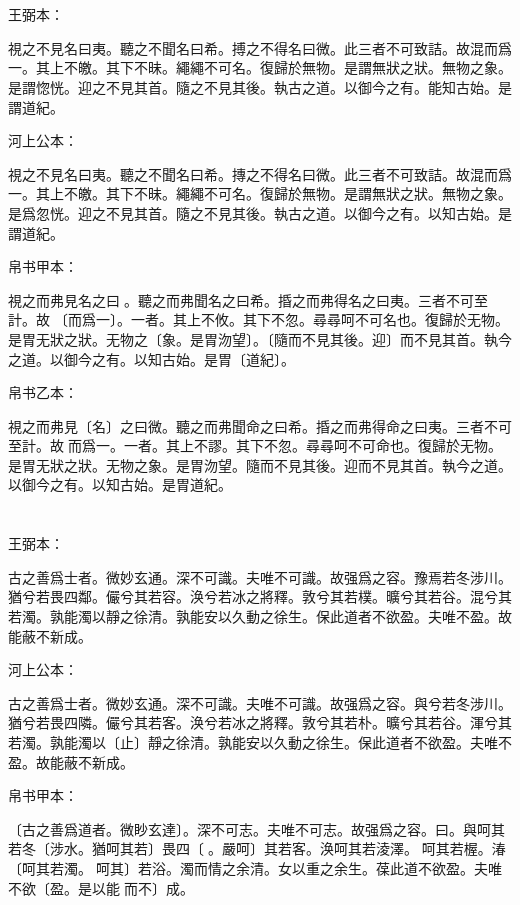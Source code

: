 \documentclass[a5paper]{ctexbook}
\begin{document}
    \chapter{}
    王弼本：

    視之不見名曰夷。聽之不聞名曰希。搏之不得名曰微。此三者不可致詰。故混而爲一。其上不皦。其下不昧。繩繩不可名。復歸於無物。是謂無狀之狀。無物之象。是謂惚恍。迎之不見其首。隨之不見其後。執古之道。以御今之有。能知古始。是謂道紀。

    河上公本：

    視之不見名曰夷。聽之不聞名曰希。摶之不得名曰微。此三者不可致詰。故混而爲一。其上不皦。其下不昧。繩繩不可名。復歸於無物。是謂無狀之狀。無物之象。是爲忽恍。迎之不見其首。隨之不見其後。執古之道。以御今之有。以知古始。是謂道紀。

    帛书甲本：

    視之而弗見名之曰󱁚。聽之而弗聞名之曰希。捪之而弗得名之曰夷。三者不可至計。故𡇯〔而爲一〕。一者。其上不攸。其下不忽。尋尋呵不可名也。復歸於无物。是胃无狀之狀。无物之〔象。是胃沕望〕。〔隨而不見其後。迎〕而不見其首。執今之道。以御今之有。以知古始。是胃〔道紀〕。

    帛书乙本：

    視之而弗見〔名〕之曰微。聽之而弗聞命之曰希。捪之而弗得命之曰夷。三者不可至計。故𦀲而爲一。一者。其上不謬。其下不忽。尋尋呵不可命也。復歸於无物。是胃无狀之狀。无物之象。是胃沕望。隨而不見其後。迎而不見其首。執今之道。以御今之有。以知古始。是胃道紀。

    \chapter{}
    王弼本：

    古之善爲士者。微妙玄通。深不可識。夫唯不可識。故强爲之容。豫焉若冬涉川。猶兮若畏四鄰。儼兮其若容。涣兮若冰之將釋。敦兮其若樸。曠兮其若谷。混兮其若濁。孰能濁以靜之徐清。孰能安以久動之徐生。保此道者不欲盈。夫唯不盈。故能蔽不新成。

    河上公本：

    古之善爲士者。微妙玄通。深不可識。夫唯不可識。故强爲之容。與兮若冬涉川。猶兮若畏四隣。儼兮其若客。涣兮若冰之將釋。敦兮其若朴。曠兮其若谷。渾兮其若濁。孰能濁以〔止〕靜之徐清。孰能安以久動之徐生。保此道者不欲盈。夫唯不盈。故能蔽不新成。

    帛书甲本：

    〔古之善爲道者。微眇玄達〕。深不可志。夫唯不可志。故强爲之容。曰。與呵其若冬〔涉水。猶呵其若〕畏四〔𠳵。嚴呵〕其若客。涣呵其若淩澤。󱁜呵其若楃。湷〔呵其若濁。𣼥呵其〕若浴。濁而情之余清。女以重之余生。葆此道不欲盈。夫唯不欲〔盈。是以能𧝬而不〕成。
\end{document}
